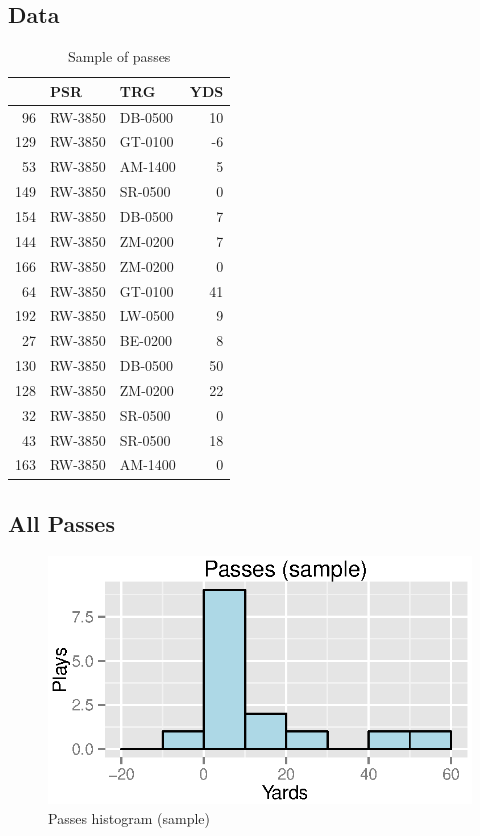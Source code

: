 \documentclass{exam}
\begin{document}
  \subsection{Data}
  \begin{table}[H]
    \centering
    \begin{tabular}{rllr}
      \toprule
          & PSR     & TRG     & YDS \\
      \midrule
      96  & RW-3850 & DB-0500 & 10 \\
      129 & RW-3850 & GT-0100 & -6 \\
      53  & RW-3850 & AM-1400 & 5 \\
      149 & RW-3850 & SR-0500 & 0 \\
      154 & RW-3850 & DB-0500 & 7 \\
      144 & RW-3850 & ZM-0200 & 7 \\
      166 & RW-3850 & ZM-0200 & 0 \\
      64  & RW-3850 & GT-0100 & 41 \\
      192 & RW-3850 & LW-0500 & 9 \\
      27  & RW-3850 & BE-0200 & 8 \\
      130 & RW-3850 & DB-0500 & 50 \\
      128 & RW-3850 & ZM-0200 & 22 \\
      32  & RW-3850 & SR-0500 & 0 \\
      43  & RW-3850 & SR-0500 & 18 \\
      163 & RW-3850 & AM-1400 & 0 \\
      \bottomrule
    \end{tabular}
    \caption{Sample of passes}
  \end{table}

  \subsection{All Passes}

  \begin{figure}[H]
    \centering
    \includegraphics{figures/nfl/sample_passes_histogram.eps}
    \caption{Passes histogram (sample)}
  \end{figure}
\end{document}
